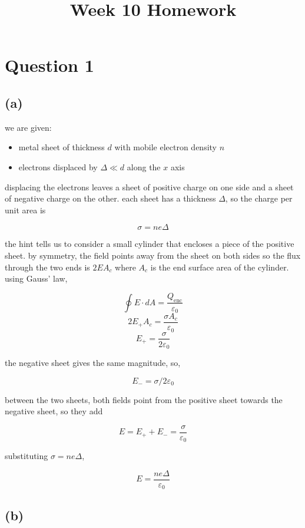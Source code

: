 \documentclass{article}
\title{Week 10 Homework}
\begin{document}
\maketitle

\section*{Question 1}

\subsection*{(a)}

we are given:

\begin{itemize}
    \item metal sheet of thickness $d$ with mobile electron density $n$
    \item electrons displaced by $\Delta\ll d$ along the $x$ axis
\end{itemize}

displacing the electrons leaves a sheet of positive charge on one side and a sheet of negative charge on the other. each sheet has a thickness $\Delta$, so the charge per unit area is

\[
\sigma=ne\Delta
\]

the hint tells us to consider a small cylinder that encloses a piece of the positive sheet. by symmetry, the 
field points away from the sheet on both sides so the flux through the two ends is $2EA_c$ where $A_c$ is the 
end surface area of the cylinder. using Gauss' law,

\[
\oint E\cdot dA=\frac{Q_{\mathrm{enc}}}{\varepsilon_0}
\]
\[
2E_{+}A_c=\frac{\sigma A_c}{\varepsilon_0}
\]
\[
E_{+}=\frac{\sigma}{2\varepsilon_0}
\]

the negative sheet gives the same magnitude, so,

\[
E_{-}=\sigma/2\varepsilon_0
\]

between the two sheets, both fields point from the positive sheet towards the negative sheet, so they add

\[
E=E_{+}+E_{-}=\frac{\sigma}{\varepsilon_0}
\]

substituting $\sigma=ne\Delta$,

\[
\boxed{E=\frac{ne\Delta}{\varepsilon_0}}
\]

\subsection*{(b)}
\end{document}
